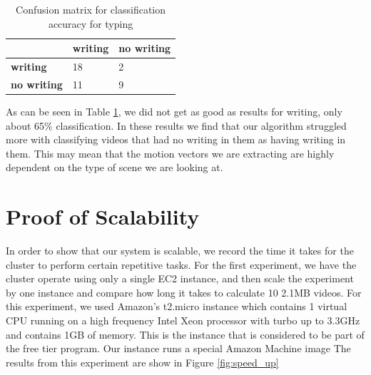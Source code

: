 
\FloatBarrier

\begin{table}[h]
  \begin{centering}
  \begin{tabular}{| l | l | l |}
  \hline
   & \textbf{writing} & \textbf{no writing}\\ \hline
  \textbf{writing} & 18 & 2 \\ \hline
  \textbf{no writing} & 11 & 9 \\ \hline
  \end{tabular}
  \caption{Confusion matrix for classification accuracy for typing}
  \label{tab:writing_confusion}
\end{centering}
\end{table}

As can be seen in Table \ref{tab:writing_confusion}, we did not get as good
as results for writing, only about 65\% classification. In these results we
find that our algorithm struggled more with classifying videos that had no
writing in them as having writing in them. This may mean that the motion vectors
we are extracting are highly dependent on the type of scene we are looking at.

\section{\label{section:scalability}Proof of Scalability}
In order to show that our system is scalable, we record the time it takes
for the cluster to perform certain repetitive tasks. For the first experiment,
we have the cluster operate using only a single EC2 instance, and then scale
the experiment by one instance and compare how long it takes to calculate 10 2.1MB
videos. For this experiment, we used Amazon's t2.micro instance which contains
1 virtual CPU running on a high frequency Intel Xeon processor with turbo
up to 3.3GHz and contains 1GB of memory. This is the instance that is considered
to be part of the free tier program. Our instance runs a special Amazon Machine
image
The results from this experiment are show in Figure \ref{fig:speed_up}

